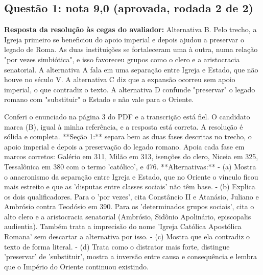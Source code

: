 \documentclass{article}%
\begin{document}
\subsection*{Questão 1: nota 9,0 (aprovada, rodada 2 de 2)}%
\textbf{Resposta da resolução às cegas do avaliador:} Alternativa B. Pelo trecho, a Igreja primeiro se beneficiou do apoio imperial e depois ajudou a preservar o legado de Roma. As duas instituições se fortaleceram uma à outra, numa relação "por vezes simbiótica", e isso favoreceu grupos como o clero e a aristocracia senatorial. A alternativa A fala em uma separação entre Igreja e Estado, que não houve no século V. A alternativa C diz que a expansão ocorreu sem apoio imperial, o que contradiz o texto. A alternativa D confunde "preservar" o legado romano com "substituir" o Estado e não vale para o Oriente.\par %
Conferi o enunciado na página 3 do PDF e a transcrição está fiel. O candidato marca (B), igual à minha referência, e a resposta está correta. A resolução é sólida e completa.\newline%
\newline%
**Seção 1:** separa bem as duas fases descritas no trecho, o apoio imperial e depois a preservação do legado romano. Apoia cada fase em marcos corretos: Galério em 311, Milão em 313, isenções do clero, Niceia em 325, Tessalônica em 380 com o termo 'católico', e 476.\newline%
\newline%
**Alternativas:**\newline%
{-} (a) Mostra o anacronismo da separação entre Igreja e Estado, que no Oriente o vínculo ficou mais estreito e que as 'disputas entre classes sociais' não têm base.\newline%
{-} (b) Explica os dois qualificadores. Para o 'por vezes', cita Constâncio II e Atanásio, Juliano e Ambrósio contra Teodósio em 390. Para os 'determinados grupos sociais', cita o alto clero e a aristocracia senatorial (Ambrósio, Sidônio Apolinário, episcopalis audientia). Também trata a imprecisão do nome 'Igreja Católica Apostólica Romana' sem descartar a alternativa por isso.\newline%
{-} (c) Mostra que ela contradiz o texto de forma literal.\newline%
{-} (d) Trata como o distrator mais forte, distingue 'preservar' de 'substituir', mostra a inversão entre causa e consequência e lembra que o Império do Oriente continuou existindo.\newline%
\newline%
\end{document}
